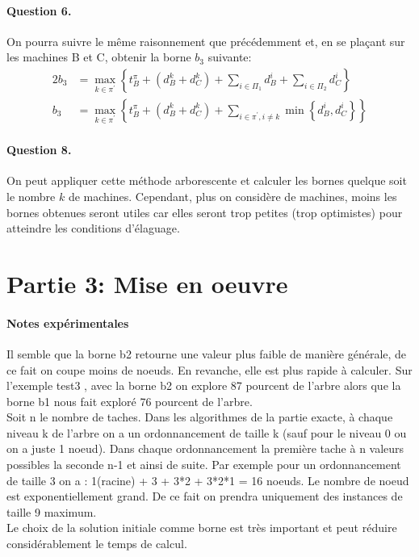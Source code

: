 \documentclass[a4paper, 10pt]{article}
\begin{document}
		\paragraph{Question 6.}{On pourra suivre le même raisonnement que précédemment et, en se plaçant sur les machines B et C, obtenir la borne $b_3$ suivante:
		\begin{alignat*}{2}
			b_3 &= \max_{k \in \pi^\prime} \left\{ t^{\pi}_B + \left( d^k_B + d^k_C \right) + \sum_{i \in \Pi_1} d^i_B + \sum_{i \in \Pi_2} d^i_C \right\} \\
			b_3 &= \max_{k \in \pi^\prime} \left\{ t^{\pi}_B + \left( d^k_B + d^k_C \right) + \sum_{i \in \pi^\prime, i \ne k} \min \left\{ d^i_B, d^i_C \right\} \right\}
		\end{alignat*}
		}
		
		\paragraph{Question 8.}{On peut appliquer cette méthode arborescente et calculer les bornes quelque soit le nombre $k$ de machines. Cependant, plus on considère de machines, moins les bornes obtenues seront utiles car elles seront trop petites (trop optimistes) pour atteindre les conditions d'élaguage. 		
		}
		
	        \section*{Partie 3: Mise en oeuvre}
	        
		\paragraph{Notes expérimentales}{Il semble que la borne b2 retourne une valeur plus faible de manière générale, de ce fait on coupe moins de noeuds. En revanche, elle est plus rapide à calculer. Sur l'exemple test3 , avec la borne b2 on explore 87 pourcent de l'arbre alors que la borne b1 nous fait exploré 76 pourcent de l'arbre. \\
                  Soit n le nombre de taches.
                  Dans les algorithmes de la partie exacte, à chaque niveau k de l'arbre on a un ordonnancement de taille k (sauf pour le niveau 0 ou on a juste 1 noeud). Dans chaque ordonnancement la première tache à n valeurs possibles la seconde n-1 et ainsi de suite. Par exemple pour un ordonnancement de taille 3 on a : 1(racine) + 3 + 3*2 + 3*2*1 = 16 noeuds. Le nombre de noeud est exponentiellement grand. De ce fait on prendra uniquement des instances de taille 9 maximum. \\
                  Le choix de la solution initiale comme borne est très important et peut réduire considérablement le temps de calcul.
                }
\end{document}
